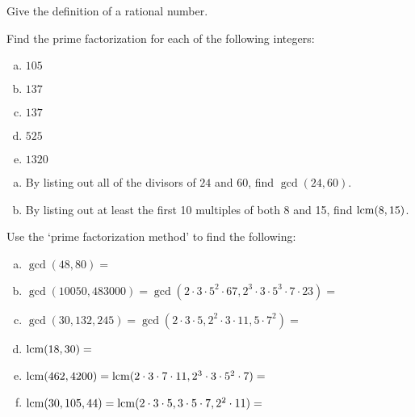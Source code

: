 \documentclass[11pt,letterpaper]{article}
\begin{document}

 Give the definition of a rational number. 



\vfill



 Find the prime factorization for each of the following integers: 
\begin{enumerate}[(a)]
\item $105$ \vfill
\item $137$ \vfill
\item $137$ \vfill
\item $525$ \vfill
\item $1320$ \vfill
\end{enumerate}



\newpage



\begin{enumerate}[(a)]
\item By listing out all of the divisors of $24$ and $60$, find $\gcd(24, 60)$. \vspace{5cm} 

\item By listing out at least the first 10 multiples of both 8 and 15, find $\operatorname{lcm}(8, 15)$. 
\end{enumerate} \vspace{5cm}





 Use the `prime factorization method' to find the following: \pspace
\begin{enumerate}[(a)]
\item $\gcd(48, 80)=$ \vfill
\item $\gcd(10050, 483000)= \gcd(2 \cdot 3 \cdot 5^2 \cdot 67, 2^3 \cdot 3 \cdot 5^3 \cdot 7 \cdot 23)=$ \vfill
\item $\gcd(30, 132, 245)= \gcd(2 \cdot 3 \cdot 5, 2^2 \cdot 3 \cdot 11, 5 \cdot 7^2)=$ \vfill
\item $\operatorname{lcm}(18,30)=$ \vfill
\item $\operatorname{lcm}(462,4200)= \operatorname{lcm}(2 \cdot 3 \cdot 7 \cdot 11, 2^3 \cdot 3 \cdot 5^2 \cdot 7)=$ \vfill
\item $\operatorname{lcm}(30, 105, 44)= \operatorname{lcm}(2 \cdot 3 \cdot 5, 3 \cdot 5 \cdot 7, 2^2 \cdot 11)=$ \vfill
\end{enumerate}
\end{document}
